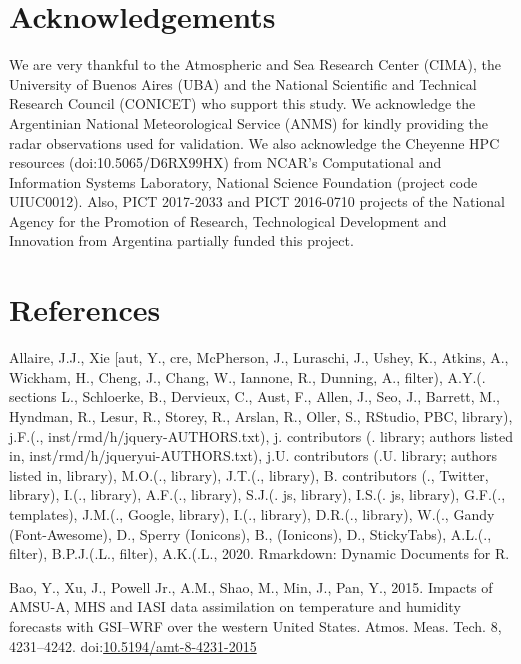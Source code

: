 \documentclass[final,5p,times,twocolumn,authoryear]{elsarticle} %
\begin{document}
\hypertarget{acknowledgements}{%
\section{Acknowledgements}\label{acknowledgements}}

We are very thankful to the Atmospheric and Sea Research Center (CIMA), the University of Buenos Aires (UBA) and the National Scientific and Technical Research Council (CONICET) who support this study. We acknowledge the Argentinian National Meteorological Service (ANMS) for kindly providing the radar observations used for validation. We also acknowledge the Cheyenne HPC resources (doi:10.5065/D6RX99HX) from NCAR's Computational and Information Systems Laboratory, National Science Foundation (project code UIUC0012). Also, PICT 2017-2033 and PICT 2016-0710 projects of the National Agency for the Promotion of Research, Technological Development and Innovation from Argentina partially funded this project.

\hypertarget{references}{%
\section*{References}\label{references}}

\hypertarget{refs}{}
\leavevmode\hypertarget{ref-allaire2020}{}%
Allaire, J.J., Xie {[}aut, Y., cre, McPherson, J., Luraschi, J., Ushey, K., Atkins, A., Wickham, H., Cheng, J., Chang, W., Iannone, R., Dunning, A., filter), A.Y.(. sections L., Schloerke, B., Dervieux, C., Aust, F., Allen, J., Seo, J., Barrett, M., Hyndman, R., Lesur, R., Storey, R., Arslan, R., Oller, S., RStudio, PBC, library), j.F.(., inst/rmd/h/jquery-AUTHORS.txt), j. contributors (. library; authors listed in, inst/rmd/h/jqueryui-AUTHORS.txt), j.U. contributors (.U. library; authors listed in, library), M.O.(., library), J.T.(., library), B. contributors (., Twitter, library), I.(., library), A.F.(., library), S.J.(. js, library), I.S.(. js, library), G.F.(., templates), J.M.(., Google, library), I.(., library), D.R.(., library), W.(., Gandy (Font-Awesome), D., Sperry (Ionicons), B., (Ionicons), D., StickyTabs), A.L.(., filter), B.P.J.(.L., filter), A.K.(.L., 2020. Rmarkdown: Dynamic Documents for R.

\leavevmode\hypertarget{ref-bao2015}{}%
Bao, Y., Xu, J., Powell Jr., A.M., Shao, M., Min, J., Pan, Y., 2015. Impacts of AMSU-A, MHS and IASI data assimilation on temperature and humidity forecasts with GSI--WRF over the western United States. Atmos. Meas. Tech. 8, 4231--4242. doi:\href{https://doi.org/10.5194/amt-8-4231-2015}{10.5194/amt-8-4231-2015}
\end{document}
